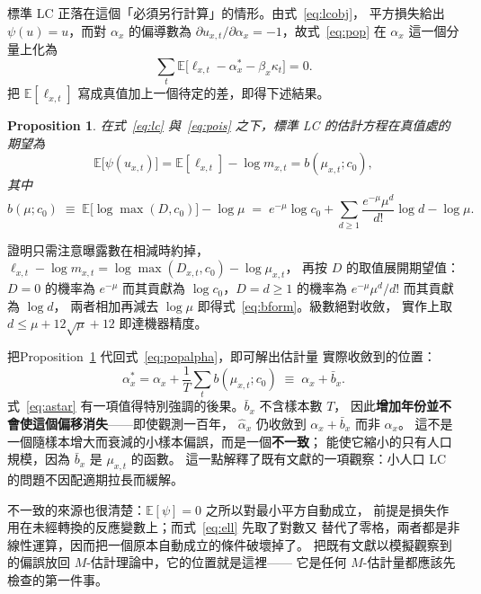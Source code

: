 \documentclass[UTF8, fontset=macnew, a4paper, 12pt]{ctexart}
\newtheorem{prop}{Proposition}
\newcommand{\Ex}{\mathbb{E}}
\begin{document}
標準 LC 正落在這個「必須另行計算」的情形。由式~\eqref{eq:lcobj}，
平方損失給出 $\psi(u)=u$，而對 $\alpha_x$ 的偏導數為
$\partial u_{x,t}/\partial\alpha_x=-1$，故式~\eqref{eq:pop} 在 $\alpha_x$
這一個分量上化為
\begin{equation}\label{eq:popalpha}
\sum_{t}\Ex\big[\ell_{x,t}-\alpha_x^{\ast}-\beta_x\kappa_t\big]=0 .
\end{equation}
把 $\Ex[\ell_{x,t}]$ 寫成真值加上一個待定的差，即得下述結果。

\begin{prop}\label{prop:fisher}
在式~\eqref{eq:lc} 與~\eqref{eq:pois} 之下，標準 LC 的估計方程在真值處的
期望為
\begin{equation}\label{eq:b}
\Ex\big[\psi(u_{x,t})\big]=\Ex[\ell_{x,t}]-\log m_{x,t}
= b(\mu_{x,t};c_0),
\end{equation}
其中
\begin{equation}\label{eq:bform}
b(\mu;c_0)\;\equiv\;\Ex\big[\log\max(D,c_0)\big]-\log\mu
\;=\;e^{-\mu}\log c_0+\sum_{d\ge1}\frac{e^{-\mu}\mu^{d}}{d!}\log d-\log\mu .
\end{equation}
\end{prop}

證明只需注意曝露數在相減時約掉，
$\ell_{x,t}-\log m_{x,t}=\log\max(D_{x,t},c_0)-\log\mu_{x,t}$，
再按 $D$ 的取值展開期望值：$D=0$ 的機率為 $e^{-\mu}$ 而其貢獻為
$\log c_0$，$D=d\ge1$ 的機率為 $e^{-\mu}\mu^{d}/d!$ 而其貢獻為 $\log d$，
兩者相加再減去 $\log\mu$ 即得式~\eqref{eq:bform}。級數絕對收斂，
實作上取 $d\le\mu+12\sqrt{\mu}+12$ 即達機器精度。

把Proposition~\ref{prop:fisher} 代回式~\eqref{eq:popalpha}，即可解出估計量
實際收斂到的位置：
\begin{equation}\label{eq:astar}
\alpha_x^{\ast}
=\alpha_x+\frac1T\sum_t b(\mu_{x,t};c_0)
\;\equiv\;\alpha_x+\bar b_x .
\end{equation}
式~\eqref{eq:astar} 有一項值得特別強調的後果。$\bar b_x$ 不含樣本數 $T$，
因此\textbf{增加年份並不會使這個偏移消失}——即使觀測一百年，
$\hat\alpha_x$ 仍收斂到 $\alpha_x+\bar b_x$ 而非 $\alpha_x$。
這不是一個隨樣本增大而衰減的小樣本偏誤，而是一個\textbf{不一致}；
能使它縮小的只有人口規模，因為 $\bar b_x$ 是 $\mu_{x,t}$ 的函數。
這一點解釋了既有文獻的一項觀察：小人口 LC 的問題不因配適期拉長而緩解。

不一致的來源也很清楚：$\Ex[\psi]=0$ 之所以對最小平方自動成立，
前提是損失作用在未經轉換的反應變數上；而式~\eqref{eq:ell} 先取了對數又
替代了零格，兩者都是非線性運算，因而把一個原本自動成立的條件破壞掉了。
把既有文獻以模擬觀察到的偏誤放回 $M$-估計理論中，它的位置就是這裡——
它是任何 $M$-估計量都應該先檢查的第一件事。
\end{document}
